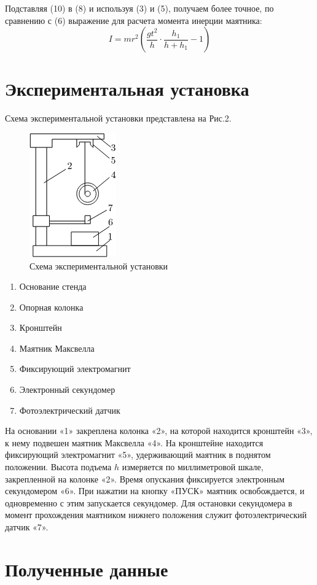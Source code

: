 \documentclass[a4paper]{article}
\begin{document}
Подставляя (10) в (8) и используя (3) и (5), получаем более точное, по сравнению с (6) выражение для расчета момента инерции маятника:
\begin{equation}
    I=mr^2\left(\dfrac{gt^2}{h}\cdot\dfrac{h_1}{h+h_1}-1\right)
\end{equation}


\section{\textbf{Экспериментальная установка}}
Схема экспериментальной установки представлена на Рис.2.
\begin{figure}[H]
\centering
\includegraphics[scale=0.5]{2.png}
\caption{Схема экспериментальной установки}
\end{figure}
\begin{enumerate}
    \item Основание стенда
    \item Опорная колонка
    \item Кронштейн
    \item Маятник Максвелла
    \item Фиксирующий электромагнит
    \item Электронный секундомер
    \item Фотоэлектрический датчик
\end{enumerate}

На основании «1» закреплена колонка «2», на которой находится кронштейн «3», к нему подвешен маятник Максвелла
«4». На кронштейне находится фиксирующий электромагнит «5»,
удерживающий маятник в поднятом положении. Высота подъема
$h$ измеряется по миллиметровой шкале, закрепленной на колонке
«2». Время опускания фиксируется электронным секундомером
«6». При нажатии на кнопку «ПУСК» маятник освобождается, и
одновременно с этим запускается секундомер. Для остановки секундомера в момент прохождения маятником нижнего положения
служит фотоэлектрический датчик «7».
\section{\textbf{Полученные данные}}
\end{document}
